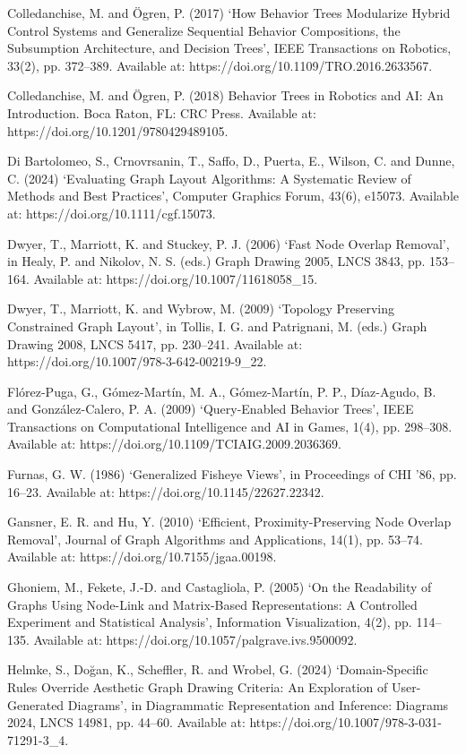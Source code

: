 \documentclass[11pt,a4paper,oneside,extrafontsizes]{memoir}
\begin{document}
Colledanchise, M. and Ögren, P. (2017) ‘How Behavior Trees Modularize Hybrid Control Systems and Generalize Sequential Behavior Compositions, the Subsumption Architecture, and Decision Trees’, IEEE Transactions on Robotics, 33(2), pp. 372–389. Available at: https://doi.org/10.1109/TRO.2016.2633567.

Colledanchise, M. and Ögren, P. (2018) Behavior Trees in Robotics and AI: An Introduction. Boca Raton, FL: CRC Press. Available at: https://doi.org/10.1201/9780429489105.

Di Bartolomeo, S., Crnovrsanin, T., Saffo, D., Puerta, E., Wilson, C. and Dunne, C. (2024) ‘Evaluating Graph Layout Algorithms: A Systematic Review of Methods and Best Practices’, Computer Graphics Forum, 43(6), e15073. Available at: https://doi.org/10.1111/cgf.15073.

Dwyer, T., Marriott, K. and Stuckey, P. J. (2006) ‘Fast Node Overlap Removal’, in Healy, P. and Nikolov, N. S. (eds.) Graph Drawing 2005, LNCS 3843, pp. 153–164. Available at: https://doi.org/10.1007/11618058\_15.

Dwyer, T., Marriott, K. and Wybrow, M. (2009) ‘Topology Preserving Constrained Graph Layout’, in Tollis, I. G. and Patrignani, M. (eds.) Graph Drawing 2008, LNCS 5417, pp. 230–241. Available at: https://doi.org/10.1007/978-3-642-00219-9\_22.

Flórez-Puga, G., Gómez-Martín, M. A., Gómez-Martín, P. P., Díaz-Agudo, B. and González-Calero, P. A. (2009) ‘Query-Enabled Behavior Trees’, IEEE Transactions on Computational Intelligence and AI in Games, 1(4), pp. 298–308. Available at: https://doi.org/10.1109/TCIAIG.2009.2036369.

Furnas, G. W. (1986) ‘Generalized Fisheye Views’, in Proceedings of CHI ’86, pp. 16–23. Available at: https://doi.org/10.1145/22627.22342.

Gansner, E. R. and Hu, Y. (2010) ‘Efficient, Proximity-Preserving Node Overlap Removal’, Journal of Graph Algorithms and Applications, 14(1), pp. 53–74. Available at: https://doi.org/10.7155/jgaa.00198.

Ghoniem, M., Fekete, J.-D. and Castagliola, P. (2005) ‘On the Readability of Graphs Using Node-Link and Matrix-Based Representations: A Controlled Experiment and Statistical Analysis’, Information Visualization, 4(2), pp. 114–135. Available at: https://doi.org/10.1057/palgrave.ivs.9500092.

Helmke, S., Doğan, K., Scheffler, R. and Wrobel, G. (2024) ‘Domain-Specific Rules Override Aesthetic Graph Drawing Criteria: An Exploration of User-Generated Diagrams’, in Diagrammatic Representation and Inference: Diagrams 2024, LNCS 14981, pp. 44–60. Available at: https://doi.org/10.1007/978-3-031-71291-3\_4.
\end{document}
